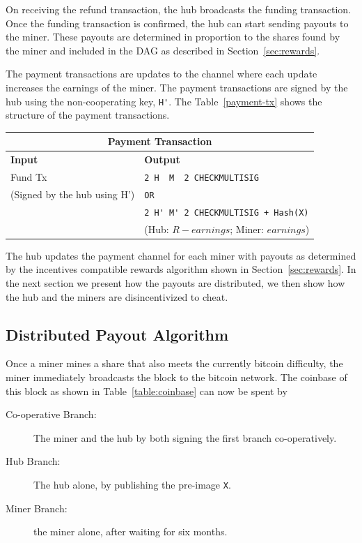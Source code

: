 \documentclass{article}
\begin{document}
On receiving the refund transaction, the hub broadcasts the funding
transaction. Once the funding transaction is confirmed, the hub can
start sending payouts to the miner. These payouts are determined in
proportion to the shares found by the miner and included in the DAG as
described in Section~\ref{sec:rewards}.

The payment transactions are updates to the channel where each update
increases the earnings of the miner. The payment transactions are
signed by the hub using the non-cooperating key, \verb|H'|. The
Table~\ref{payment-tx} shows the structure of the payment
transactions.

\begin{center}
  \begin{tabular}{ ll }
    \multicolumn{2}{c}{\bfseries Payment Transaction} \\
    \midrule
    \bfseries Input & \bfseries Output \\
    \midrule
    Fund Tx & \verb|2 H  M  2 CHECKMULTISIG| \\
    (Signed by the hub using H') & \verb|OR| \\
                    & \verb|2 H' M' 2 CHECKMULTISIG + Hash(X)| \\
                    & (Hub: $R - earnings$; Miner: $earnings$) \\
    \midrule
  \end{tabular}
\end{center}

The hub updates the payment channel for each miner with payouts as
determined by the incentives compatible rewards algorithm shown in
Section~\ref{sec:rewards}. In the next section we present how the
payouts are distributed, we then show how the hub and the miners are
disincentivized to cheat.

\subsection{Distributed Payout Algorithm}

Once a miner mines a share that also meets the currently bitcoin
difficulty, the miner immediately broadcasts the block to the bitcoin
network. The coinbase of this block as shown in
Table~\ref{table:coinbase} can now be spent by

\begin{description}
\item[Co-operative Branch:] The miner and the hub by both signing the
  first branch co-operatively.
\item[Hub Branch:] The hub alone, by publishing the pre-image \verb|X|.
\item[Miner Branch:] the miner alone, after waiting for six months.
\end{description}
\end{document}
